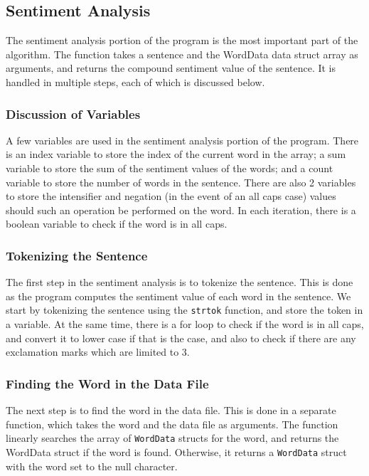 \documentclass[12pt]{article}
\begin{document}
\subsection{Sentiment Analysis}

The sentiment analysis portion of the program is the most important part of the algorithm.
The function takes a sentence and the WordData data struct array as arguments, and returns the compound sentiment value of the sentence.
It is handled in multiple steps, each of which is discussed below.

\subsubsection{Discussion of Variables}

A few variables are used in the sentiment analysis portion of the program.
There is an index variable to store the index of the current word in the array; a sum variable to store the sum of the sentiment values of the words; and a count variable to store the number of words in the sentence.
There are also 2 variables to store the intensifier and negation (in the event of an all caps case) values should such an operation be performed on the word.
In each iteration, there is a boolean variable to check if the word is in all caps.

\subsubsection{Tokenizing the Sentence}

The first step in the sentiment analysis is to tokenize the sentence.
This is done as the program computes the sentiment value of each word in the sentence.
We start by tokenizing the sentence using the \texttt{strtok} function, and store the token in a variable.
At the same time, there is a for loop to check if the word is in all caps, and convert it to lower case if that is the case, and also to check if there are any exclamation marks which are limited to 3.

\subsubsection{Finding the Word in the Data File}

The next step is to find the word in the data file.
This is done in a separate function, which takes the word and the data file as arguments.
The function linearly searches the array of \texttt{WordData} structs for the word, and returns the WordData struct if the word is found.
Otherwise, it returns a \texttt{WordData} struct with the word set to the null character.
\end{document}
